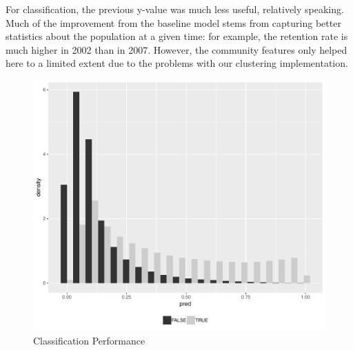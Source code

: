 \documentclass[letterpaper, 12pt, conference]{ieeeconf}
\begin{document}
For classification, the previous y-value was much less useful, relatively speaking. Much of the improvement from the baseline model stems from capturing better statistics about the population at a given time: for example, the retention rate is much higher in 2002 than in 2007. However, the community features only helped here to a limited extent due to the problems with our clustering implementation.
\begin{figure}[ht]
    \centering
    \includegraphics[width=1\linewidth]{class_full.pdf}
    \caption{Classification Performance}
    \label{fig:class_full}
\end{figure}
\end{document}
